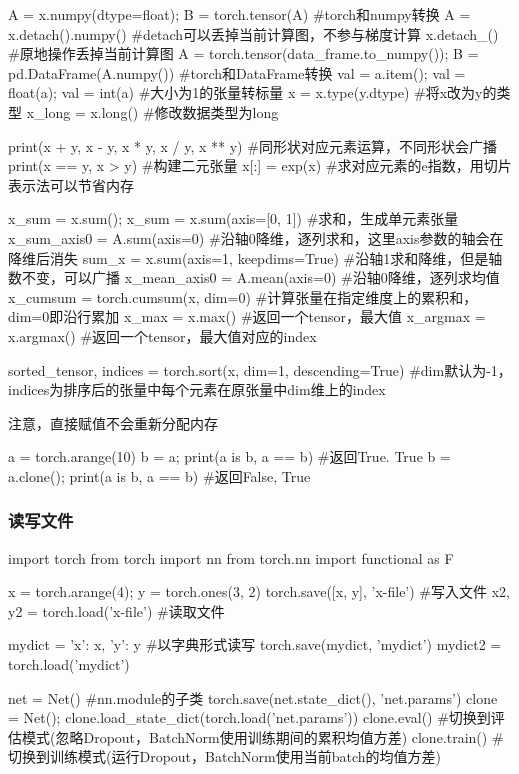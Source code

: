 \begin{codeblock}[language=python, caption={basic manipulation}]
        A = x.numpy(dtype=float); B = torch.tensor(A) #torch和numpy转换
        A = x.detach().numpy() #detach可以丢掉当前计算图，不参与梯度计算
        x.detach_() #原地操作丢掉当前计算图
        A = torch.tensor(data_frame.to_numpy()); B = pd.DataFrame(A.numpy()) 
            #torch和DataFrame转换
        val = a.item(); val = float(a); val = int(a) #大小为1的张量转标量
        x = x.type(y.dtype) #将x改为y的类型
        x_long = x.long() #修改数据类型为long

        print(x + y, x - y, x * y, x / y, x ** y) #同形状对应元素运算，不同形状会广播
        print(x == y, x > y) #构建二元张量
        x[:] = exp(x) #求对应元素的e指数，用切片表示法可以节省内存

        x_sum = x.sum(); x_sum = x.sum(axis=[0, 1]) #求和，生成单元素张量
        x_sum_axis0 = A.sum(axis=0) #沿轴0降维，逐列求和，这里axis参数的轴会在降维后消失
        sum_x = x.sum(axis=1, keepdims=True) #沿轴1求和降维，但是轴数不变，可以广播
        x_mean_axis0 = A.mean(axis=0) #沿轴0降维，逐列求均值
        x_cumsum = torch.cumsum(x, dim=0) #计算张量在指定维度上的累积和，dim=0即沿行累加
        x_max = x.max() #返回一个tensor，最大值
        x_argmax = x.argmax() #返回一个tensor，最大值对应的index

        sorted_tensor, indices = torch.sort(x, dim=1, descending=True)
        #dim默认为-1，indices为排序后的张量中每个元素在原张量中dim维上的index
      \end{codeblock}

      注意，直接赋值不会重新分配内存
      \begin{codeblock}[language=python, caption={equal and clone}]
        a = torch.arange(10)
        b = a; print(a is b, a == b) #返回True. True
        b = a.clone(); print(a is b, a == b) #返回False, True
      \end{codeblock}

    \subsubsection{读写文件}
      \begin{codeblock}[language=python, caption={File I/O}]
        import torch
        from torch import nn
        from torch.nn import functional as F

        x = torch.arange(4); y = torch.ones(3, 2)
        torch.save([x, y], 'x-file') #写入文件
        x2, y2 = torch.load('x-file') #读取文件

        mydict = {'x': x, 'y': y} #以字典形式读写
        torch.save(mydict, 'mydict')
        mydict2 = torch.load('mydict')

        net = Net() #nn.module的子类
        torch.save(net.state_dict(), 'net.params')
        clone = Net(); clone.load_state_dict(torch.load('net.params'))
        clone.eval() #切换到评估模式(忽略Dropout，BatchNorm使用训练期间的累积均值方差)
        clone.train() #切换到训练模式(运行Dropout，BatchNorm使用当前batch的均值方差)
      \end{codeblock}

